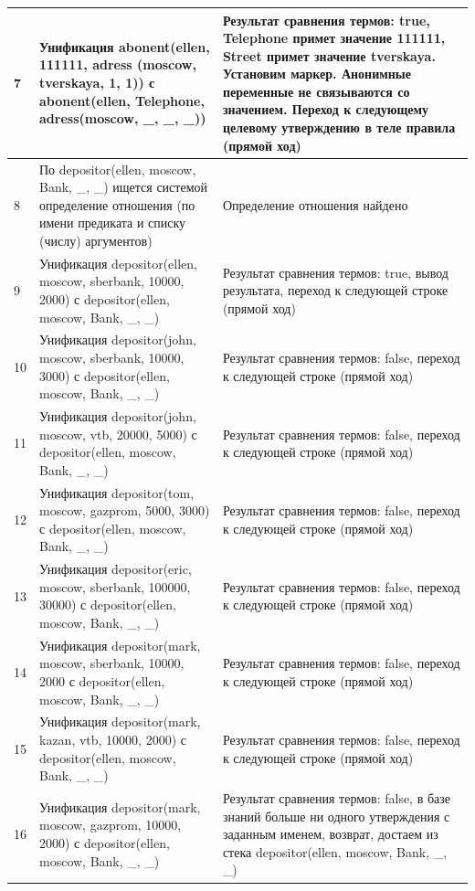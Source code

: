 \documentclass[a4paper,14pt]{extreport} %
\begin{document}
\begin{longtable}{|p{1.1cm}|p{8.5cm}|p{7cm}|}
	7 & Унификация abonent(ellen, 111111, adress (moscow, tverskaya, 1, 1)) с abonent(ellen, Telephone, adress(moscow, \_, \_, \_)) & Результат сравнения термов: true, Telephone примет значение 111111, Street примет значение tverskaya. Установим маркер. Анонимные переменные не связываются со значением. Переход к следующему целевому утверждению в теле правила (прямой ход) \\ \hline
	
	8 & По depositor(ellen, moscow, Bank, \_, \_) ищется системой определение отношения (по имени предиката и списку (числу) аргументов) & Определение отношения найдено \\ \hline
	9 & Унификация depositor(ellen, moscow, sberbank, 10000, 2000) с depositor(ellen, moscow, Bank, \_, \_)& Результат сравнения термов: true, вывод результата, переход к следующей строке (прямой ход) \\ \hline
	10 & Унификация depositor(john, moscow, sberbank, 10000, 3000) с depositor(ellen, moscow, Bank, \_, \_) & Результат сравнения термов: false, переход к следующей строке (прямой ход) \\ \hline
	11 & Унификация depositor(john, moscow, vtb, 20000, 5000) с depositor(ellen, moscow, Bank, \_, \_) & Результат сравнения термов: false, переход к следующей строке (прямой ход) \\ \hline
	12 & Унификация depositor(tom, moscow, gazprom, 5000, 3000) с depositor(ellen, moscow, Bank, \_, \_) & Результат сравнения термов: false, переход к следующей строке (прямой ход) \\ \hline
	13 & Унификация depositor(eric, moscow, sberbank, 100000, 30000) с depositor(ellen, moscow, Bank, \_, \_) & Результат сравнения термов: false, переход к следующей строке (прямой ход) \\ \hline
	14 & Унификация depositor(mark, moscow, sberbank, 10000, 2000 с depositor(ellen, moscow, Bank, \_, \_) & Результат сравнения термов: false, переход к следующей строке (прямой ход) \\ \hline
	15 & Унификация depositor(mark, kazan, vtb, 10000, 2000) с depositor(ellen, moscow, Bank, \_, \_) & Результат сравнения термов:  false, переход к следующей строке (прямой ход) \\ \hline
	16 & Унификация depositor(mark, moscow, gazprom, 10000, 2000) с depositor(ellen, moscow, Bank, \_, \_) &  Результат сравнения термов: false, в базе знаний больше ни одного утверждения с заданным именем, возврат, достаем из стека depositor(ellen, moscow, Bank, \_, \_) \\ \hline
	

\end{longtable}
\end{document}
